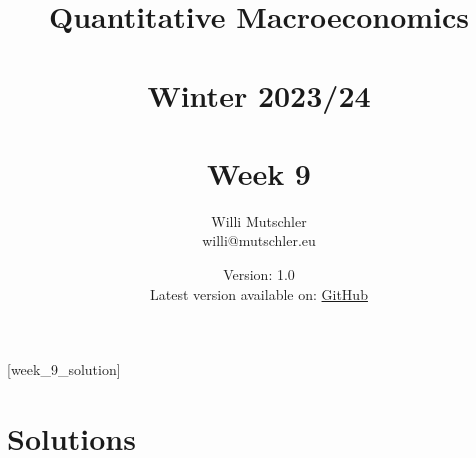
\newif\ifDisplaySolutions\DisplaySolutionstrue


\title{Quantitative Macroeconomics\\~\\Winter 2023/24\\~\\Week 9}
\author{Willi Mutschler\\willi@mutschler.eu}
\date{Version: 1.0\\Latest version available on: \href{https://github.com/wmutschl/Quantitative-Macroeconomics/releases/latest/download/week_9.pdf}{GitHub}}
\maketitle\thispagestyle{empty}

\newpage
{}[week_9_solution]
\tableofcontents\thispagestyle{empty}\newpage

\setcounter{page}{1}
\newpage
\newpage
\newpage

\printbibliography
\newpage

\ifDisplaySolutions
\newpage
\appendix
\section{Solutions}

\fi

